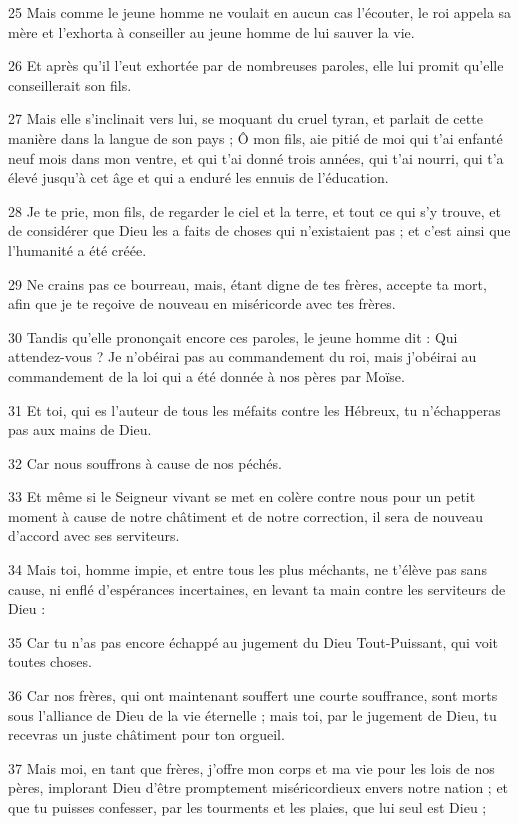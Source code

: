 \par 25 Mais comme le jeune homme ne voulait en aucun cas l'écouter, le roi appela sa mère et l'exhorta à conseiller au jeune homme de lui sauver la vie.
\par 26 Et après qu'il l'eut exhortée par de nombreuses paroles, elle lui promit qu'elle conseillerait son fils.
\par 27 Mais elle s'inclinait vers lui, se moquant du cruel tyran, et parlait de cette manière dans la langue de son pays ; Ô mon fils, aie pitié de moi qui t'ai enfanté neuf mois dans mon ventre, et qui t'ai donné trois années, qui t'ai nourri, qui t'a élevé jusqu'à cet âge et qui a enduré les ennuis de l'éducation.
\par 28 Je te prie, mon fils, de regarder le ciel et la terre, et tout ce qui s'y trouve, et de considérer que Dieu les a faits de choses qui n'existaient pas ; et c’est ainsi que l’humanité a été créée.
\par 29 Ne crains pas ce bourreau, mais, étant digne de tes frères, accepte ta mort, afin que je te reçoive de nouveau en miséricorde avec tes frères.
\par 30 Tandis qu'elle prononçait encore ces paroles, le jeune homme dit : Qui attendez-vous ? Je n'obéirai pas au commandement du roi, mais j'obéirai au commandement de la loi qui a été donnée à nos pères par Moïse.
\par 31 Et toi, qui es l'auteur de tous les méfaits contre les Hébreux, tu n'échapperas pas aux mains de Dieu.
\par 32 Car nous souffrons à cause de nos péchés.
\par 33 Et même si le Seigneur vivant se met en colère contre nous pour un petit moment à cause de notre châtiment et de notre correction, il sera de nouveau d'accord avec ses serviteurs.
\par 34 Mais toi, homme impie, et entre tous les plus méchants, ne t'élève pas sans cause, ni enflé d'espérances incertaines, en levant ta main contre les serviteurs de Dieu :
\par 35 Car tu n'as pas encore échappé au jugement du Dieu Tout-Puissant, qui voit toutes choses.
\par 36 Car nos frères, qui ont maintenant souffert une courte souffrance, sont morts sous l'alliance de Dieu de la vie éternelle ; mais toi, par le jugement de Dieu, tu recevras un juste châtiment pour ton orgueil.
\par 37 Mais moi, en tant que frères, j'offre mon corps et ma vie pour les lois de nos pères, implorant Dieu d'être promptement miséricordieux envers notre nation ; et que tu puisses confesser, par les tourments et les plaies, que lui seul est Dieu ;
